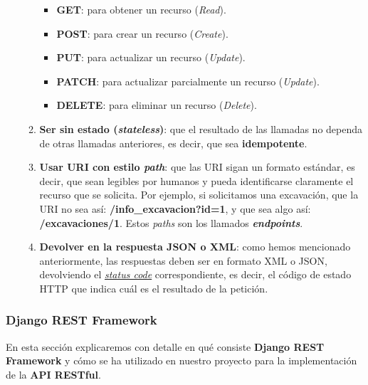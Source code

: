 \begin{itemize}
\begin{enumerate}
                    \begin{itemize}
                        \item \textbf{GET}: para obtener un recurso (\textit{Read}).
                        \item \textbf{POST}: para crear un recurso (\textit{Create}).
                        \item \textbf{PUT}: para actualizar un recurso (\textit{Update}).
                        \item \textbf{PATCH}: para actualizar parcialmente un
                        recurso (\textit{Update}).
                        \item \textbf{DELETE}: para eliminar un recurso (\textit{Delete}).
                    \end{itemize}

                \item \textbf{Ser sin estado (\textit{stateless})}: que el resultado de las
                llamadas no dependa de otras llamadas anteriores, es decir, que sea
                \textbf{idempotente}.
                \item \textbf{Usar URI con estilo \textit{path}}: que las URI sigan un formato
                estándar, es decir, que sean legibles por humanos y pueda identificarse
                claramente el recurso que se solicita. Por ejemplo, si solicitamos una
                excavación, que la URI no sea así: \textbf{/info\_excavacion?id=1}, y que
                sea algo así: \textbf{/excavaciones/1}. Estos \textit{paths} son los
                llamados \textbf{\textit{endpoints}}.
                \item \textbf{Devolver en la respuesta JSON o XML}: como hemos mencionado
                anteriormente, las respuestas deben ser en formato XML o JSON,
                devolviendo el \href{https://developer.mozilla.org/es/docs/Web/HTTP/Status}
                {\textit{status code}} correspondiente, es decir, el código de estado HTTP
                que indica cuál es el resultado de la petición.
            \end{enumerate}
    \end{itemize}

\subsubsection{Django REST Framework}
En esta sección explicaremos con detalle  en qué consiste \textbf{Django REST Framework}
\cite{djangorestframework} y cómo se ha utilizado en nuestro proyecto para la
implementación de la \textbf{API RESTful}.\\

